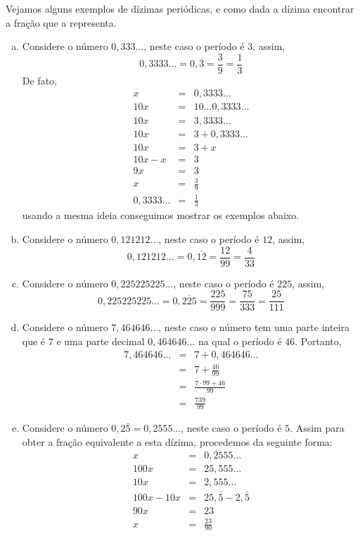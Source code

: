 \begin{exem} Vejamos alguns exemplos de dízimas periódicas, e como dada a dízima encontrar a fração que a representa.

  \begin{enumerate}[a)]
   \item Considere o número $0,333 \ldots$, neste caso o período é $3$, assim,
   \[0,3333 \ldots= 0,\overline{3}= \frac{3}{9}= \frac{1}{3}\]
   De fato,
   \begin{eqnarray*}
    x &=& 0,3333 \ldots \\
    10x &=& 10 \ldots 0,3333 \ldots \\
    10x &=& 3,3333 \ldots \\
    10x &=& 3 + 0,3333 \ldots \\
    10x &=& 3 + x \\
    10x - x &=& 3 \\
    9x &=& 3 \\
    x &=& \frac{3}{9} \\
    0,3333 \ldots &=& \frac{1}{3}
   \end{eqnarray*}
   usando a mesma ideia conseguimos mostrar os exemplos abaixo.

   \item Considere o número $0,121212 \ldots$, neste caso o período é $12$, assim,
   \[0,121212 \ldots= 0,\overline{12}= \frac{12}{99}= \frac{4}{33}\]

   \item Considere o número $0,225225225 \ldots$, neste caso o período é $225$, assim,
   \[0,225225225 \ldots= 0,\overline{225}= \frac{225}{999}= \frac{75}{333}=\frac{25}{111}\]

   \item Considere o número $7,464646 \ldots$, neste caso o número tem uma parte inteira que é $7$ e uma parte decimal $0,464646 \ldots$ na qual o período é $46$. Portanto,
   \begin{eqnarray*}
    7,464646 \ldots &=& 7+0,464646 \ldots \\
    &=& 7 + \frac{46}{99} \\
    &=& \frac{7\cdot 99 + 46}{99}\\
    &=& \frac{739}{99}
   \end{eqnarray*}

   \item Considere o número $0,2\bar{5}= 0,2555 \ldots$, neste caso o período é $5$. Assim para obter a fração equivalente a esta dízima, procedemos da seguinte forma:
   \begin{eqnarray*}
    x &=& 0,2555 \ldots \\
    100x &=& 25,555 \ldots \\
    10x &=& 2,555 \ldots \\
    100x - 10x &=& 25,\bar{5} - 2, \bar{5} \\
    90x &=& 23 \\
    x&=& \frac{23}{90}
   \end{eqnarray*}


\end{enumerate}
\end{exem}
